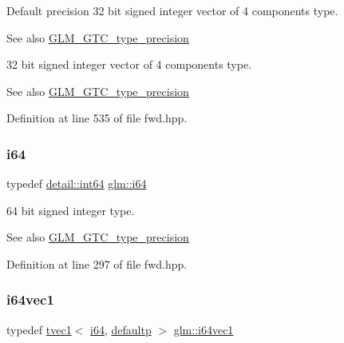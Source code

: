 Default precision 32 bit signed integer vector of 4 components type. \begin{DoxySeeAlso}{See also}
\mbox{\hyperlink{group__gtc__type__precision}{G\+L\+M\+\_\+\+G\+T\+C\+\_\+type\+\_\+precision}}
\end{DoxySeeAlso}
32 bit signed integer vector of 4 components type. \begin{DoxySeeAlso}{See also}
\mbox{\hyperlink{group__gtc__type__precision}{G\+L\+M\+\_\+\+G\+T\+C\+\_\+type\+\_\+precision}} 
\end{DoxySeeAlso}


Definition at line 535 of file fwd.\+hpp.

\mbox{\label{group__gtc__type__precision_gac7a7eaad46064fc952b06df33689da23}} 
\subsubsection{\texorpdfstring{i64}{i64}}
{\footnotesize\ttfamily typedef \mbox{\hyperlink{namespaceglm_1_1detail_a5b1c3227ec636c24a0676746381adfc8}{detail\+::int64}} \mbox{\hyperlink{group__gtc__type__precision_gac7a7eaad46064fc952b06df33689da23}{glm\+::i64}}}

64 bit signed integer type. \begin{DoxySeeAlso}{See also}
\mbox{\hyperlink{group__gtc__type__precision}{G\+L\+M\+\_\+\+G\+T\+C\+\_\+type\+\_\+precision}} 
\end{DoxySeeAlso}


Definition at line 297 of file fwd.\+hpp.

\mbox{\label{group__gtc__type__precision_ga7ee2c91a98ebd719ae26e15ad89106de}} 
\subsubsection{\texorpdfstring{i64vec1}{i64vec1}}
{\footnotesize\ttfamily typedef \mbox{\hyperlink{structglm_1_1tvec1}{tvec1}}$<$ \mbox{\hyperlink{group__gtc__type__precision_gac7a7eaad46064fc952b06df33689da23}{i64}}, \mbox{\hyperlink{namespaceglm_a0f04f086094c747d227af4425893f545a9d21ccd8b5a009ec7eb7677befc3bf51}{defaultp}} $>$ \mbox{\hyperlink{group__gtc__type__precision_ga7ee2c91a98ebd719ae26e15ad89106de}{glm\+::i64vec1}}}


